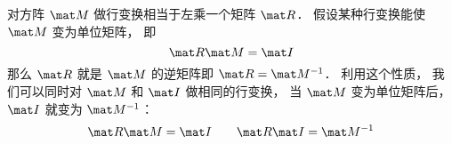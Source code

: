 
\begin{issues}
\issueDraft
\end{issues}


对方阵 $\mat M$ 做行变换相当于左乘一个矩阵 $\mat R$． 假设某种行变换能使 $\mat M$ 变为单位矩阵， 即
\begin{equation}
\mat R \mat M = \mat I
\end{equation}
那么 $\mat R$ 就是 $\mat M$ 的逆矩阵即 $\mat R = \mat M^{-1}$． 利用这个性质， 我们可以同时对 $\mat M$ 和 $\mat I$ 做相同的行变换， 当 $\mat M$ 变为单位矩阵后， $\mat I$ 就变为 $\mat M^{-1}$：
\begin{equation}
\mat R\mat M = \mat I
\qquad
\mat R \mat I = \mat M^{-1}
\end{equation}

